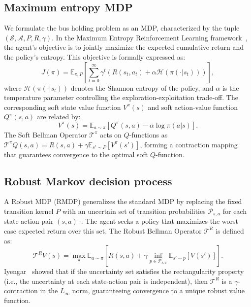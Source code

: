 \documentclass[10pt]{article}
\begin{document}
\subsection{Maximum entropy MDP}
We formulate the bus holding problem as an MDP, characterized by the tuple $(\mathcal{S}, \mathcal{A}, P, R, \gamma)$. In the Maximum Entropy Reinforcement Learning framework~\cite{Haarnoja2018SAC}, the agent's objective is to jointly maximize the expected cumulative return and the policy's entropy. This objective is formally expressed as:
\begin{equation}
    J(\pi) = \mathbb{E}_{\pi, P} \left[ \sum_{t=0}^{\infty} \gamma^t \left( R(s_t, a_t) + \alpha \mathcal{H}(\pi(\cdot|s_t)) \right) \right],
\end{equation}
where $\mathcal{H}(\pi(\cdot|s_t))$ denotes the Shannon entropy of the policy, and $\alpha$ is the temperature parameter controlling the exploration-exploitation trade-off. The corresponding soft state value function $V^\pi(s)$ and soft action-value function $Q^\pi(s, a)$ are related by:
\begin{equation}
    V^\pi(s) = \mathbb{E}_{a \sim \pi} [Q^\pi(s, a) - \alpha \log \pi(a|s)].
\end{equation}
The Soft Bellman Operator $\mathcal{T}^\pi$ acts on $Q$-functions as $\mathcal{T}^\pi Q(s, a) = R(s, a) + \gamma \mathbb{E}_{s' \sim P} [V^\pi(s')]$, forming a contraction mapping that guarantees convergence to the optimal soft $Q$-function.

\subsection{Robust Markov decision process}
A Robust MDP (RMDP) generalizes the standard MDP by replacing the fixed transition kernel $P$ with an uncertain set of transition probabilities $\mathcal{P}_{s,a}$ for each state-action pair $(s,a)$~\cite{Iyengar2005RobustDP, Wiesemann2013RobustMDP}. The agent seeks a policy that maximizes the worst-case expected return over this set. The Robust Bellman Operator $\mathcal{T}^R$ is defined as:
\begin{equation}
    \mathcal{T}^R V(s) = \max_{\pi} \mathbb{E}_{a \sim \pi} \left[ R(s, a) + \gamma \inf_{p \in \mathcal{P}_{s,a}} \mathbb{E}_{s' \sim p} [V(s')] \right].
\end{equation}
Iyengar~\cite{Iyengar2005RobustDP} showed that if the uncertainty set satisfies the rectangularity property (i.e., the uncertainty at each state-action pair is independent), then $\mathcal{T}^R$ is a $\gamma$-contraction in the $L_\infty$ norm, guaranteeing convergence to a unique robust value function.
\end{document}
